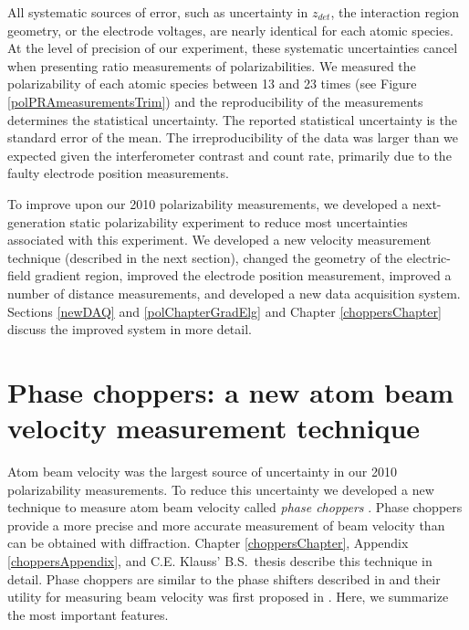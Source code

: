 All systematic sources of error, such as uncertainty in $z_{det}$, the interaction region geometry, or the electrode voltages, are nearly identical for each atomic species. At the level of precision of our experiment, these systematic uncertainties cancel when presenting ratio measurements of polarizabilities. We measured the polarizability of each atomic species between 13 and 23 times (see Figure \ref{polPRAmeasurementsTrim}) and the reproducibility of the measurements determines the statistical uncertainty. The reported statistical uncertainty is the standard error of the mean. The irreproducibility of the data was larger than we expected given the interferometer contrast and count rate, primarily due to the faulty electrode position measurements.  


To improve upon our 2010 polarizability measurements, we developed a next-generation static polarizability experiment to reduce most uncertainties associated with this experiment. We developed a new velocity measurement technique (described in the next section), changed the geometry of the electric-field gradient region, improved the electrode position measurement, improved a number of distance measurements, and developed a new data acquisition system. Sections \ref{newDAQ} and \ref{polChapterGradElg} and Chapter \ref{choppersChapter} discuss the improved system in more detail.





\pagebreak
\section{Phase choppers: a new atom beam velocity measurement technique}
\label{choppersBrief}

Atom beam velocity was the largest source of uncertainty in our 2010 polarizability measurements. To reduce this uncertainty we developed a new technique to measure atom beam velocity called \emph{phase choppers} \cite{Hol11}. Phase choppers provide a more precise and more accurate measurement of beam velocity than can be obtained with diffraction. Chapter \ref{choppersChapter}, Appendix \ref{choppersAppendix}, and C.E. Klauss' B.S.~thesis \cite{Kla11} describe this technique in detail. Phase choppers are similar to the phase shifters described in \cite{Rob04} and their utility for measuring beam velocity was first proposed in \cite{Rob02}. Here, we summarize the most important features.

